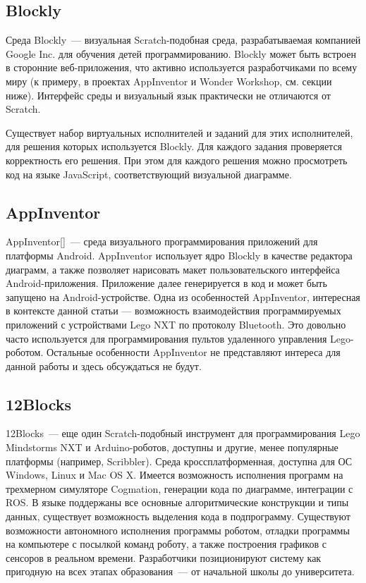 \documentclass[a5paper]{article}
\begin{document}
\subsection{Blockly}

Среда Blockly~--- визуальная Scratch-подобная среда, разрабатываемая компанией Google Inc. для обучения детей 
программированию. Blockly может быть встроен в сторонние веб-приложения, что активно используется разработчиками 
по всему миру (к примеру, в проектах AppInventor и Wonder Workshop, см. секции ниже). Интерфейс среды и  визуальный 
язык практически не отличаются от Scratch. 

Существует набор виртуальных исполнителей и заданий для этих исполнителей, для решения которых используется Blockly. 
Для каждого задания проверяется корректность его решения. При этом для каждого решения можно просмотреть код 
на языке JavaScript, соответствующий визуальной диаграмме.

\subsection{AppInventor}

AppInventor[]~--- среда визуального программирования приложений для платформы Android. AppInventor использует ядро 
Blockly в качестве редактора диаграмм, а также позволяет нарисовать макет пользовательского интерфейса 
Android-приложения. Приложение далее генерируется в код и может быть запущено на Android-устройстве. Одна 
из особенностей AppInventor, интересная в контексте данной статьи --- возможность взаимодействия программируемых 
приложений с устройствами Lego NXT по протоколу Bluetooth. Это довольно часто используется для программирования 
пультов удаленного управления Lego-роботом. Остальные особенности AppInventor не представляют интереса для данной 
работы и здесь обсуждаться не будут.

\subsection{12Blocks}
12Blocks~--- еще один Scratch-подобный инструмент для программирования Lego Mindstorms NXT и Arduino-роботов, 
доступны и другие, менее популярные платформы (например, Scribbler). Среда кроссплатформенная, доступна для 
ОС Windows, Linux и Mac OS X. Имеется возможность исполнения программ на трехмерном симуляторе Cogmation, 
генерации кода по диаграмме, интеграции с ROS. В языке поддержаны все основные алгоритмические конструкции и 
типы данных, существует возможность выделения кода в подпрограмму. Существуют возможности автономного исполнения 
программы роботом, отладки программы на компьютере с посылкой команд роботу, а также построения графиков с 
сенсоров в реальном времени. Разработчики позиционируют систему как пригодную на всех этапах образования~--- от 
начальной школы до университета.
\end{document}
